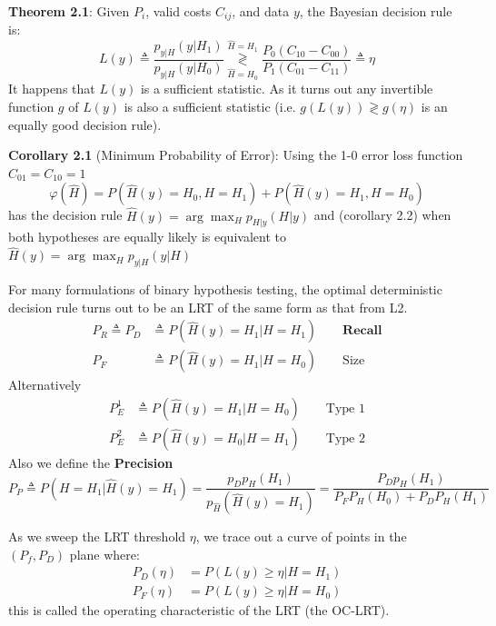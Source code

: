 \documentclass[12pt]{article} %
\newcommand{\LRT}[2]{%
  \mathrel{\mathop\gtrless\limits^{#1}_{#2}}%
}
\begin{document}
\textbf{Theorem 2.1}: Given $P_i$, valid costs $C_{ij}$, and data $y$, the Bayesian decision rule is:
\begin{equation*}
    L(y) \triangleq
    \frac{p_{y|H}(y|H_1)}{p_{y|H}(y|H_0)}
    \LRT{\hat{H} = H_1}{\hat{H} = H_0}
    \frac{P_0(C_{10} - C_{00})}{P_1(C_{01} - C_{11})}
    \triangleq
    \eta
\end{equation*}
It happens that $L(y)$ is a sufficient statistic. As it turns out any invertible function $g$ of $L(y)$ is also a sufficient statistic (i.e. $g(L(y)) \gtrless g(\eta)$ is an equally good decision rule).


\textbf{Corollary 2.1} (Minimum Probability of Error): Using the 1-0 error loss function $C_{01}=C_{10} = 1$
\begin{equation*}
    \varphi(\hat{H}) = P(\hat{H}(y) = H_0, H = H_1) + P(\hat{H}(y) = H_1, H = H_0)
\end{equation*}
has the decision rule $\hat{H}(y) = \arg \max_{H} p_{H|y}(H|y)$ and (corollary 2.2) when both hypotheses are equally likely is equivalent to $\hat{H}(y) = \arg \max_{H} p_{y|H}(y|H)$

\newpage


For many formulations of binary hypothesis testing, the optimal deterministic decision rule turns out to be an LRT of the same form as that from L2.
\begin{align*}
    P_R \triangleq P_D &\triangleq P(\hat{H}(y) = H_1 | H = H_1) \qquad \textbf{Recall}
    \\
    P_F &\triangleq P(\hat{H}(y) = H_1 | H = H_0) \qquad \text{Size}
\end{align*}
Alternatively
\begin{align*}
    P_E^1 &\triangleq P(\hat{H}(y) = H_1 | H = H_0) \qquad \text{Type 1}
    \\
    P_E^2 &\triangleq P(\hat{H}(y) = H_0 | H = H_1) \qquad \text{Type 2}
\end{align*}
Also we define the \textbf{Precision}
\begin{equation*}
    P_P \triangleq P(H = H_1 | \hat{H}(y) = H_1) 
    =
    \frac{p_Dp_H(H_1)}{p_{\hat{H}}(\hat{H}(y) = H_1)}
    =
    \frac{P_D p_H(H_1)}{P_FP_H(H_0) + P_D P_H(H_1)}
\end{equation*}

\separate

As we sweep the LRT threshold $\eta$, we trace out a curve of points in the $(P_f, P_D)$ plane where:
\begin{align*}
    P_D(\eta) &= P(L(y) \geq \eta | H = H_1) \\
    P_F(\eta) &= P(L(y) \geq \eta | H = H_0)
\end{align*}
this is called the operating characteristic of the LRT (the OC-LRT).
\end{document}
